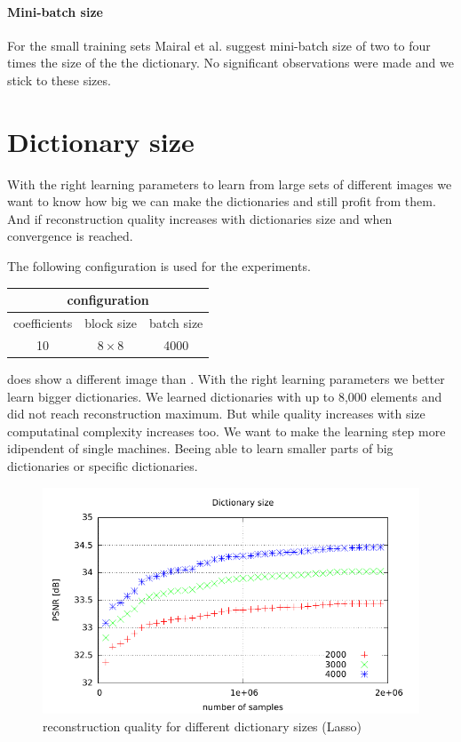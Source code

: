 
\paragraph{Mini-batch size}
For the small training sets Mairal et al. suggest mini-batch size of two to four
times the size of the the dictionary. No significant observations were made
and we stick to these sizes. 

\clearpage

\section{Dictionary size}
With the right learning parameters to learn from large sets of
different images we want to know how big we can make the dictionaries and
still profit from them. And if reconstruction quality increases with
dictionaries size and when convergence is reached. 

The following configuration is used for the experiments. 
\begin{table}[H]
\centering
\begin{tabular}{| c | c | c |}
\hline
\multicolumn{3}{|c|}{configuration}\\
\hline
coefficients & block size & batch size \\
\hline
10 & $8\times 8$ & 4000  \\
\hline
\end{tabular}
\end{table}

 does show a different image than
. With the right learning parameters 
we better learn bigger dictionaries. We learned dictionaries with up to 8,000
elements and did not reach reconstruction maximum. But while quality increases
with size computatinal complexity increases too. We want to make the learning
step more idipendent of single machines. Beeing able to learn smaller parts of
big dictionaries or specific dictionaries.


\begin{figure}[h]
\centering
\includegraphics[width = 1.0\textwidth]{../tests/results/dictSizeLassoGod.pdf}
\caption{reconstruction quality for different dictionary sizes (Lasso)}
\label{fig:dictSizeGood}
\end{figure}

